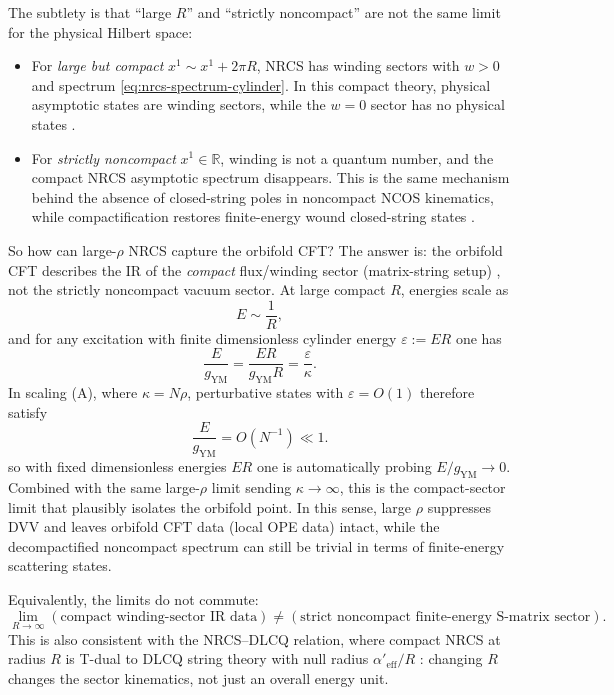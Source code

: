 \documentclass[11pt]{article}
\newcommand{\bR}{\mathbb{R}}
\newcommand{\Aeff}{\alpha'_{\mathrm{eff}}}
\begin{document}
The subtlety is that ``large $R$'' and ``strictly noncompact'' are not the same limit for the physical Hilbert space:
\begin{itemize}
\item For \emph{large but compact} $x^1\sim x^1+2\pi R$, NRCS has winding sectors with $w>0$ and spectrum \eqref{eq:nrcs-spectrum-cylinder}. In this compact theory, physical asymptotic states are winding sectors, while the $w=0$ sector has no physical states \cite{gomis2000nonrelativisticclosedstringtheory}.
\item For \emph{strictly noncompact} $x^1\in \bR$, winding is not a quantum number, and the compact NRCS asymptotic spectrum disappears. This is the same mechanism behind the absence of closed-string poles in noncompact NCOS kinematics, while compactification restores finite-energy wound closed-string states \cite{klebanov200011dimensionalncosun,seiberg2000stringsbackgroundelectricfield,gopakumar2000sdualitynoncommutativegaugetheory}.
\end{itemize}

So how can large-$\rho$ NRCS capture the orbifold CFT? The answer is: the orbifold CFT describes the IR of the \emph{compact} flux/winding sector (matrix-string setup) \cite{dijkgraaf1997matrixstring}, not the strictly noncompact vacuum sector. At large compact $R$, energies scale as
\begin{equation}
E\sim \frac{1}{R},
\end{equation}
and for any excitation with finite dimensionless cylinder energy
$\varepsilon:=ER$ one has
\begin{equation}
\frac{E}{g_{\mathrm{YM}}}
=
\frac{ER}{g_{\mathrm{YM}}R}
=
\frac{\varepsilon}{\kappa}.
\end{equation}
In scaling (A), where $\kappa=N\rho$, perturbative states with
$\varepsilon=O(1)$ therefore satisfy
\begin{equation}
\frac{E}{g_{\mathrm{YM}}}=O(N^{-1})\ll 1.
\end{equation}
so with fixed dimensionless energies $ER$ one is automatically probing
$E/g_{\mathrm{YM}}\to 0$. Combined with the same large-$\rho$ limit sending
$\kappa\to\infty$, this is the compact-sector limit that plausibly isolates the
orbifold point.
In this sense, large $\rho$ suppresses DVV and leaves orbifold CFT data (local OPE data) intact, while the decompactified noncompact spectrum can still be trivial in terms of finite-energy scattering states.

Equivalently, the limits do not commute:
\begin{equation}
\lim_{R\to\infty}\!\left(\text{compact winding-sector IR data}\right)
\neq
\left(\text{strict noncompact finite-energy S-matrix sector}\right).
\end{equation}
This is also consistent with the NRCS--DLCQ relation, where compact NRCS at radius $R$ is T-dual to DLCQ string theory with null radius $\Aeff/R$ \cite{gomis2000nonrelativisticclosedstringtheory}: changing $R$ changes the sector kinematics, not just an overall energy unit.
\end{document}
